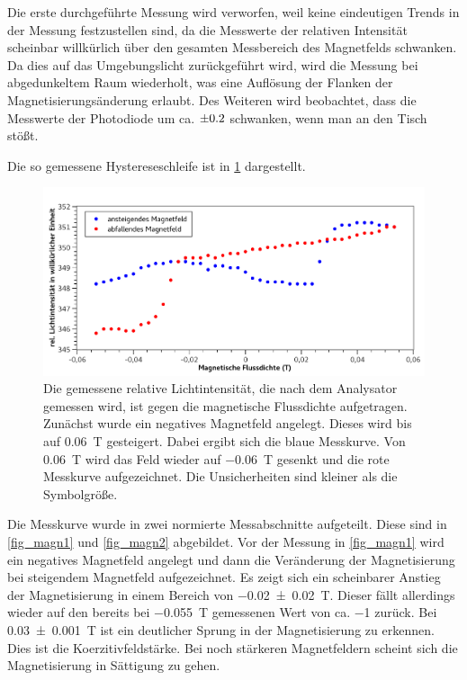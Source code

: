 \documentclass[
	a4paper,
	12pt,
	pagesize,
	ngerman
]{scrartcl}
\begin{document}
	Die erste durchgeführte Messung wird verworfen, weil keine eindeutigen Trends in der Messung festzustellen sind, da die Messwerte der relativen Intensität scheinbar willkürlich über den gesamten Messbereich des Magnetfelds schwanken.
	Da dies auf das Umgebungslicht zurückgeführt wird, wird die Messung bei abgedunkeltem Raum wiederholt, was eine Auflösung der Flanken der Magnetisierungsänderung erlaubt.
	Des Weiteren wird beobachtet, dass die Messwerte der Photodiode um ca. $\SI{\pm0,2}{}$ schwanken, wenn man an den Tisch stößt.

	Die so gemessene Hystereseschleife ist in \cref{fig_magn_licht} dargestellt.
		
	\begin{figure}[H] 
		\includegraphics[width=1.00\textwidth]{fig_magn_licht} 
		\centering
		\caption{Die gemessene relative Lichtintensität, die nach dem Analysator gemessen wird, ist gegen die magnetische Flussdichte aufgetragen. 
		Zunächst wurde ein negatives Magnetfeld angelegt. 
		Dieses wird bis auf \SI{0,06}{T} gesteigert.
		Dabei ergibt sich die blaue Messkurve.
		Von \SI{0,06}{T} wird das Feld wieder auf \SI{-0,06}{T} gesenkt und die rote Messkurve aufgezeichnet.
		Die Unsicherheiten sind kleiner als die Symbolgröße.} 
		\label{fig_magn_licht}
		\centering
	\end{figure}

	Die Messkurve wurde in zwei normierte Messabschnitte aufgeteilt.
	Diese sind in \cref{fig_magn1} und \cref{fig_magn2} abgebildet.
	Vor der Messung in \cref{fig_magn1} wird ein negatives Magnetfeld angelegt und dann die Veränderung der Magnetisierung bei steigendem Magnetfeld aufgezeichnet.
	Es zeigt sich ein scheinbarer Anstieg der Magnetisierung in einem Bereich von \SI{-0,02+-0,02}{T}. 
	Dieser fällt allerdings wieder auf den bereits bei \SI{-0,055}{T} gemessenen Wert von ca. \SI{-1}{} zurück.
	Bei \SI{0,03+-0,001}{T} ist ein deutlicher Sprung in der Magnetisierung zu erkennen. 
	Dies ist die Koerzitivfeldstärke. 
	Bei noch stärkeren Magnetfeldern scheint sich die Magnetisierung in Sättigung zu gehen.
\end{document}

